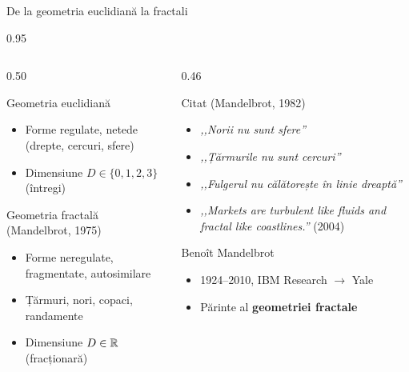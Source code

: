 \documentclass[9pt, aspectratio=169, t]{beamer}
\begin{document}
\begin{frame}[shrink=15]{De la geometria euclidiană la fractali}
\begin{cminipage}{0.95\textwidth}
\begin{columns}[T]
\begin{column}{0.50\textwidth}
\begin{block}{Geometria euclidiană}
\begin{itemize}\setlength{\itemsep}{0pt}
    \item Forme regulate, netede (drepte, cercuri, sfere)
    \item Dimensiune $D\in\{0,1,2,3\}$ (întregi)
\end{itemize}
\end{block}
\begin{block}{Geometria fractală (Mandelbrot, 1975)}
\begin{itemize}\setlength{\itemsep}{0pt}
    \item Forme neregulate, fragmentate, autosimilare
    \item Țărmuri, nori, copaci, randamente
    \item Dimensiune $D\in\mathbb{R}$ (fracționară)
\end{itemize}
\end{block}
\end{column}
\begin{column}{0.46\textwidth}
\begin{alertblock}{Citat (Mandelbrot, 1982)}
\begin{itemize}\setlength{\itemsep}{0pt}
    \item \textit{,,Norii nu sunt sfere''}
    \item \textit{,,Țărmurile nu sunt cercuri''}
    \item \textit{,,Fulgerul nu călătorește în linie dreaptă''}
    \item \textit{,,Markets are turbulent like fluids and fractal like coastlines.''} (2004)
\end{itemize}
\end{alertblock}
\begin{exampleblock}{Benoît Mandelbrot}
\begin{itemize}\setlength{\itemsep}{0pt}
    \item 1924--2010, IBM Research $\to$ Yale
    \item Părinte al \textbf{geometriei fractale}
\end{itemize}
\end{exampleblock}
\end{column}
\end{columns}
\end{cminipage}
\end{frame}
\end{document}
